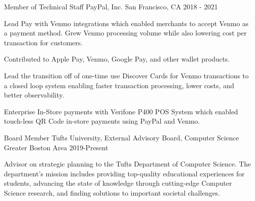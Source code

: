 
\begin{cventries}

  \cventry
    {Member of Technical Staff} %
    {PayPal, Inc.} %
    {San Francisco, CA} %
    {2018 - 2021} %
    {
      \begin{cvitems} %
        \item {Lead Pay with Venmo integrations which enabled merchants to accept Venmo as a payment method. Grew Venmo processing volume while also lowering cost per transaction for customers.}
        \item {Contributed to Apple Pay, Venmo, Google Pay, and other wallet products.}
        \item {Lead the transition off of one-time use Discover Cards for Venmo transactions to a closed loop system enabling faster transaction processing, lower costs, and better observability.}
        \item {Enterprise In-Store payments with Verifone P400 POS System which enabled touch-less QR Code in-store payments using PayPal and Venmo.}
      \end{cvitems}
    }

  \cventry
    {Board Member} %
    {Tufts University, External Advisory Board, Computer Science} %
    {Greater Boston Area} %
    {2019-Present} %
    {
      \begin{cvitems} %
      \item {Advisor on strategic planning to the Tufts Department of Computer Science. The department's mission includes providing top-quality educational experiences for students, advancing the state of knowledge through cutting-edge Computer Science research, and finding solutions to important societal challenges.}
      \end{cvitems}
    }


\end{cventries}
